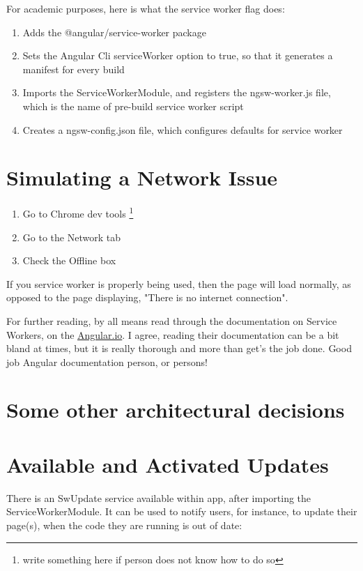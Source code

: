 For academic purposes, here is what the service worker flag does:
\begin{enumerate}
  \item Adds the @angular/service-worker package
  \item Sets the Angular Cli serviceWorker option to true, so that it generates
  a manifest for every build
  \item Imports the ServiceWorkerModule, and registers the ngsw-worker.js file,
  which is the name of pre-build service worker script
  \item Creates a ngsw-config.json file, which configures defaults for service
  worker
\end{enumerate}

\section{ Simulating a Network Issue }
\begin{enumerate}
  \item Go to Chrome dev tools \footnote{write something here if person does not know how
  to do so}
  \item Go to the Network tab
  \item Check the Offline box
\end{enumerate}

If you service worker is properly being used, then the page will load normally,
as opposed to the page displaying, "There is no internet connection".

For further reading, by all means read through the documentation on Service
Workers, on the \href{https://angular.io/guide/service-worker-getting-started}{Angular.io}.
I agree, reading their documentation can be a bit bland at times, but it is
really thorough and more than get's the job done. Good job Angular documentation
person, or persons!

\section{ Some other architectural decisions }

\section{ Available and Activated Updates }
There is an SwUpdate service available within app, after importing the
ServiceWorkerModule. It can be used to notify users, for instance, to update
their page(s), when the code they are running is out of date:

